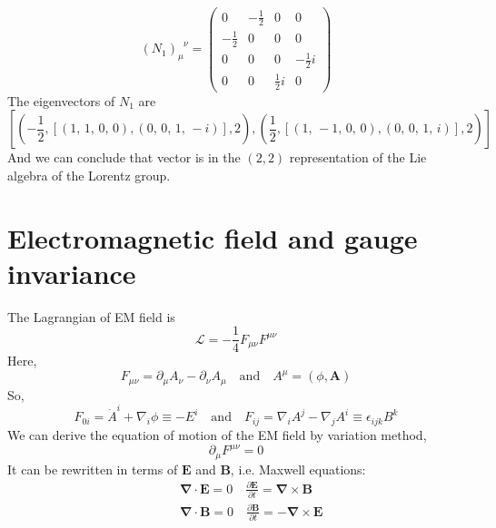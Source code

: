 \[(N_1)_{\mu}^{\phantom{\mu}\nu} = \left(\begin{array}{rrrr}
0 & -\frac{1}{2} & 0 & 0 \\
-\frac{1}{2} & 0 & 0 & 0 \\
0 & 0 & 0 & -\frac{1}{2} i \\
0 & 0 & \frac{1}{2} i & 0
\end{array}\right)\]
The eigenvectors of $N_1$ are
\[\left[\left(-\frac{1}{2}, \left[\left(1,\,1,\,0,\,0\right),
\left(0,\,0,\,1,\,-i\right)\right], 2\right), \left(\frac{1}{2},
\left[\left(1,\,-1,\,0,\,0\right), \left(0,\,0,\,1,\,i\right)\right],
2\right)\right]\]
And we can conclude that vector is in the $(2,2)$ representation of the Lie algebra of the Lorentz group.

\section{Electromagnetic field and gauge invariance}
\noindent
The Lagrangian of EM field is
\[\mathcal{L} = -\frac{1}{4}F_{\mu\nu}F^{\mu\nu}\]
Here,
\[F_{\mu\nu} = \partial_{\mu} A_{\nu} - \partial_{\nu} A_{\mu} \quad \mbox{and} \quad A^{\mu} = (\phi,\bm{A})\]
So,
\[F_{0i} = \dot{A}^i + \nabla_i \phi \equiv -E^i \quad \mbox{and} \quad F_{ij} = \nabla_i A^j - \nabla_j A^i \equiv \epsilon_{ijk}B^k\]
We can derive the equation of motion of the EM field by variation method,
\[\partial_{\mu}F^{\mu \nu} = 0\]
It can be rewritten in terms of $\bm{E}$ and $\bm{B}$, i.e. Maxwell equations:
\begin{eqnarray}
&\phantom{=}&\bm{\nabla} \cdot \bm{E} = 0 \quad \frac{\partial \bm{E}}{\partial t} = \bm{\nabla} \times \bm{B} \nonumber \\
&\phantom{=}& \bm{\nabla} \cdot \bm{B} = 0  \quad \frac{\partial \bm{B}}{\partial t} = - \bm{\nabla} \times \bm{E}\nonumber
\end{eqnarray}

